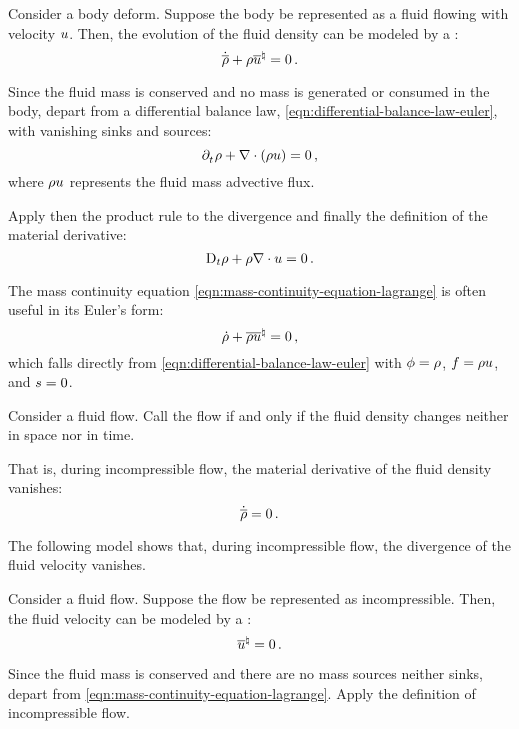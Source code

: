 \begin{model}
  Consider a body deform. Suppose the body be represented as a fluid flowing with velocity $u$. Then, the evolution of the fluid density can be modeled by a :
  \begin{equation}\label{eqn:mass-continuity-equation-lagrange}
    \dot{\overline{\rho}} + \rho{\overline{u}}^{\natural} = 0\,.
  \end{equation}
\end{model}
%
\begin{argument}
  Since the fluid mass is conserved and no mass is generated or consumed in the body, depart from a differential balance law, \cref{eqn:differential-balance-law-euler}, with vanishing sinks and sources:
  \begin{equation*}%
    \cpd t\dens + \odiv\vat{\dens\vel} = 0\,,
  \end{equation*}
  where $\rho u$ represents the fluid mass advective flux.

  Apply then the product rule to the divergence and finally the definition of the material derivative:
  \begin{equation*}
    \mathrm{D}_{t}\rho + \rho\nabla\cdot u = 0\,.
  \end{equation*}
\end{argument}
%
The mass continuity equation \cref{eqn:mass-continuity-equation-lagrange} is often useful in its Euler's form:
%
\begin{equation}\label{eqn:mass-continuity-equation-euler}
  \dot{\rho} + {\overline{\rho u}}^{\natural} = 0\,,
\end{equation}
%
which falls directly from \cref{eqn:differential-balance-law-euler} with $\phi = \rho$, $f = \rho u$, and $s = 0$.

\begin{definition}
  Consider a fluid flow. Call the flow  if and only if the fluid density changes neither in space nor in time.
\end{definition}
%
That is, during incompressible flow, the material derivative of the fluid density vanishes:
%
\begin{equation}\label{eqn:definition-incompressible-flow}
  \dot{\overline{\rho}} = 0\,.
\end{equation}

The following model shows that, during incompressible flow, the divergence of the fluid velocity vanishes.
%
\begin{model}
  Consider a fluid flow. Suppose the flow be represented as incompressible. Then, the fluid velocity can be modeled by a :
  \begin{equation}\label{eqn:incompressible-flow-equation}
    {\overline{u}}^{\natural} = 0\,.
  \end{equation}
\end{model}
%
\begin{argument}
  Since the fluid mass is conserved and there are no mass sources neither sinks, depart from \cref{eqn:mass-continuity-equation-lagrange}. Apply the definition of incompressible flow.
\end{argument}


